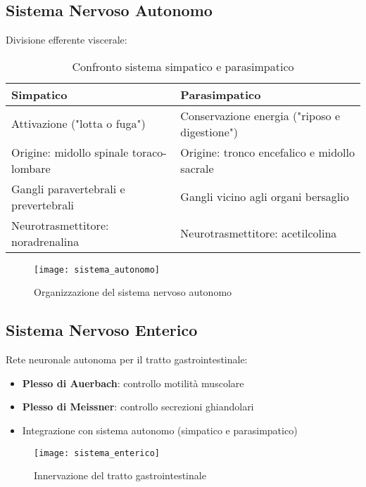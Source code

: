 \documentclass[11pt]{article}
\begin{document}
\subsection*{Sistema Nervoso Autonomo}
Divisione efferente viscerale:
\begin{table}[h]
\centering
\caption{Confronto sistema simpatico e parasimpatico}
\begin{tabular}{p{7cm}p{7cm}}
\toprule
\textbf{Simpatico} & \textbf{Parasimpatico} \\
\midrule
Attivazione ("lotta o fuga") & Conservazione energia ("riposo e digestione") \\
Origine: midollo spinale toraco-lombare & Origine: tronco encefalico e midollo sacrale \\
Gangli paravertebrali e prevertebrali & Gangli vicino agli organi bersaglio \\
Neurotrasmettitore: noradrenalina & Neurotrasmettitore: acetilcolina \\
\bottomrule
\end{tabular}
\end{table}
\begin{figure}[h]
    \centering
    \texttt{[image: sistema\_autonomo]} %
    \caption{Organizzazione del sistema nervoso autonomo}
    \label{fig:autonomo}
\end{figure}

\subsection*{Sistema Nervoso Enterico}
Rete neuronale autonoma per il tratto gastrointestinale:
\begin{itemize}
    \item \textbf{Plesso di Auerbach}: controllo motilità muscolare
    \item \textbf{Plesso di Meissner}: controllo secrezioni ghiandolari
    \item Integrazione con sistema autonomo (simpatico e parasimpatico)
\end{itemize}
\begin{figure}[h]
    \centering
    \texttt{[image: sistema\_enterico]} %
    \caption{Innervazione del tratto gastrointestinale}
    \label{fig:enterico}
\end{figure}
\end{document}
